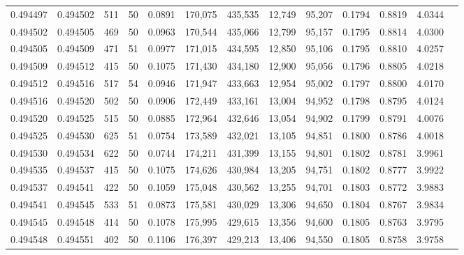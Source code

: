 \begin{tabular}{rrrrrrrrrrrrr}
0.494497 & 0.494502 &   511 &  50 &                                     0.0891 & 170,075 & 435,535 &  12,749 &  95,207 & 0.1794 & 0.8819 & 4.0344 \\
0.494502 & 0.494505 &   469 &  50 &                                     0.0963 & 170,544 & 435,066 &  12,799 &  95,157 & 0.1795 & 0.8814 & 4.0300 \\
0.494505 & 0.494509 &   471 &  51 &                                     0.0977 & 171,015 & 434,595 &  12,850 &  95,106 & 0.1795 & 0.8810 & 4.0257 \\
0.494509 & 0.494512 &   415 &  50 &                                     0.1075 & 171,430 & 434,180 &  12,900 &  95,056 & 0.1796 & 0.8805 & 4.0218 \\
0.494512 & 0.494516 &   517 &  54 &                                     0.0946 & 171,947 & 433,663 &  12,954 &  95,002 & 0.1797 & 0.8800 & 4.0170 \\
0.494516 & 0.494520 &   502 &  50 &                                     0.0906 & 172,449 & 433,161 &  13,004 &  94,952 & 0.1798 & 0.8795 & 4.0124 \\
0.494520 & 0.494525 &   515 &  50 &                                     0.0885 & 172,964 & 432,646 &  13,054 &  94,902 & 0.1799 & 0.8791 & 4.0076 \\
0.494525 & 0.494530 &   625 &  51 &                                     0.0754 & 173,589 & 432,021 &  13,105 &  94,851 & 0.1800 & 0.8786 & 4.0018 \\
0.494530 & 0.494534 &   622 &  50 &                                     0.0744 & 174,211 & 431,399 &  13,155 &  94,801 & 0.1802 & 0.8781 & 3.9961 \\
0.494535 & 0.494537 &   415 &  50 &                                     0.1075 & 174,626 & 430,984 &  13,205 &  94,751 & 0.1802 & 0.8777 & 3.9922 \\
0.494537 & 0.494541 &   422 &  50 &                                     0.1059 & 175,048 & 430,562 &  13,255 &  94,701 & 0.1803 & 0.8772 & 3.9883 \\
0.494541 & 0.494545 &   533 &  51 &                                     0.0873 & 175,581 & 430,029 &  13,306 &  94,650 & 0.1804 & 0.8767 & 3.9834 \\
0.494545 & 0.494548 &   414 &  50 &                                     0.1078 & 175,995 & 429,615 &  13,356 &  94,600 & 0.1805 & 0.8763 & 3.9795 \\
0.494548 & 0.494551 &   402 &  50 &                                     0.1106 & 176,397 & 429,213 &  13,406 &  94,550 & 0.1805 & 0.8758 & 3.9758 \\

\end{tabular}
